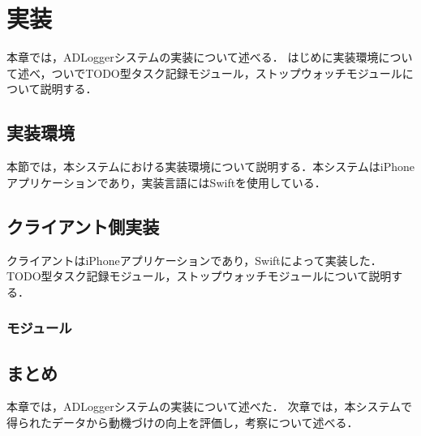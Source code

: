 \chapter{実装}
本章では，ADLoggerシステムの実装について述べる．
はじめに実装環境について述べ，ついでTODO型タスク記録モジュール，ストップウォッチモジュールについて説明する．

\section{実装環境}
本節では，本システムにおける実装環境について説明する．本システムはiPhoneアプリケーションであり，実装言語にはSwiftを使用している．

\section{クライアント側実装}
クライアントはiPhoneアプリケーションであり，Swiftによって実装した．
TODO型タスク記録モジュール，ストップウォッチモジュールについて説明する．

\subsection{モジュール}

\section{まとめ}
本章では，ADLoggerシステムの実装について述べた．
次章では，本システムで得られたデータから動機づけの向上を評価し，考察について述べる．
